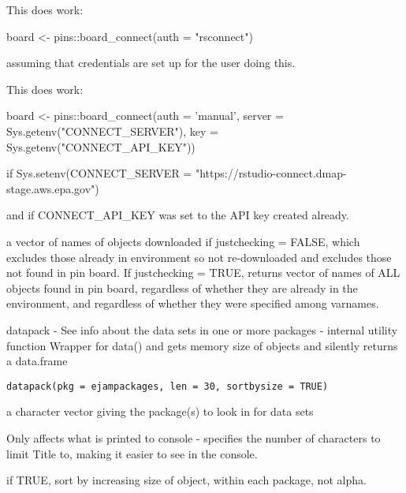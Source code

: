 \documentclass[a4paper]{book}
\begin{document}
%
\begin{Details}\relax
This does work:

board <- pins::board\_connect(auth = "rsconnect")

assuming that credentials are set up for the user doing this.

This does work:

board <- pins::board\_connect(auth = 'manual', server = Sys.getenv("CONNECT\_SERVER"), key = Sys.getenv("CONNECT\_API\_KEY"))

if   Sys.setenv(CONNECT\_SERVER = "https://rstudio-connect.dmap-stage.aws.epa.gov")

and if  CONNECT\_API\_KEY  was set to the API key created already.
\end{Details}
%
\begin{Value}
a vector of names of objects downloaded if justchecking = FALSE, which excludes those
already in environment so not re-downloaded and excludes those not found in pin board.
If justchecking = TRUE, returns vector of names of ALL objects found in pin board,
regardless of whether they are already in the environment, and
regardless of whether they were specified among varnames.
\end{Value}
%
\begin{Description}\relax
datapack - See info about the data sets in one or more packages - internal utility function
Wrapper for data() and gets memory size of objects and silently returns a data.frame
\end{Description}
%
\begin{Usage}
\begin{verbatim}
datapack(pkg = ejampackages, len = 30, sortbysize = TRUE)
\end{verbatim}
\end{Usage}
%
\begin{Arguments}
\begin{ldescription}
\item[\code{pkg}] a character vector giving the package(s) to look in for data sets

\item[\code{len}] Only affects what is printed to console - specifies the
number of characters to limit Title to, making it easier to see in the console.

\item[\code{sortbysize}] if TRUE, sort by increasing size of object, within each package, not alpha.
\end{ldescription}
\end{Arguments}
\end{document}
